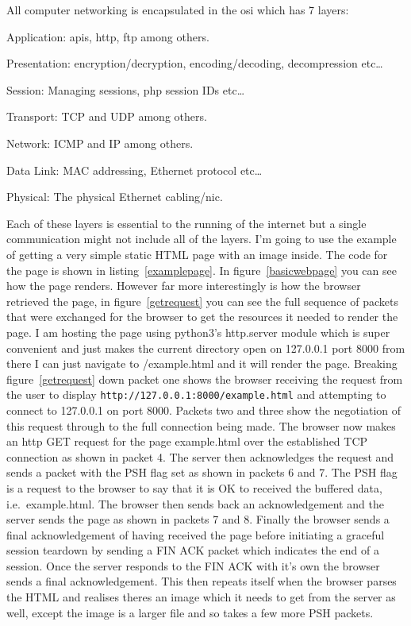 \documentclass[titlepage]{article}
\begin{document}
All computer networking is encapsulated in the \gls{osi} which has 7 layers:
\begin{etaremune}
  \item{Application: \gls{api}s, \gls{http}, \gls{ftp} among others.}
  \item{Presentation: encryption/decryption, encoding/decoding, decompression etc\ldots}
  \item{Session: Managing sessions, \gls{php} session IDs etc\ldots}
  \item{Transport: TCP and UDP among others.}
  \item{Network: ICMP and IP among others.}
  \item{Data Link: MAC addressing, Ethernet protocol etc\ldots}
  \item{Physical: The physical Ethernet cabling/\gls{nic}.}
\end{etaremune}
Each of these layers is essential to the running of the internet but a single communication
might not include all of the layers. I'm going to use the example of getting a very
simple static HTML page with an image inside. The code for the page is shown in
listing~\ref{examplepage}. In figure~\ref{basicwebpage} you can see how the page renders.
However far more interestingly is how the browser retrieved the page, in figure~\ref{getrequest}
you can see the full sequence of packets that were exchanged for the browser to get the resources
it needed to render the page. I am hosting the page using python3's http.server module
which is super convenient and just makes the current directory open on 127.0.0.1 port 8000
from there I can just navigate to /example.html and it will render the page. Breaking
figure~\ref{getrequest} down packet one shows the browser receiving the request from
the user to display \verb|http://127.0.0.1:8000/example.html| and attempting to connect
to 127.0.0.1 on port 8000. Packets two and three show the negotiation of this request
through to the full connection being made. The browser now makes an \gls{http} GET
request for the page example.html over the established TCP connection as shown in packet 4.
The server then acknowledges the request and sends a packet with the PSH flag set
as shown in packets 6 and 7. The PSH flag is a request to the browser to say that it is
OK to received the buffered data, i.e.\ example.html. The browser then sends back an
acknowledgement and the server sends the page as shown in packets 7 and 8. Finally
the browser sends a final acknowledgement of having received the page before initiating
a graceful session teardown by sending a FIN ACK packet which indicates the end of a session.
Once the server responds to the FIN ACK with it's own the browser sends a final acknowledgement.
This then repeats itself when the browser parses the HTML and realises theres an image which
it needs to get from the server as well, except the image is a larger file and so takes a few
more PSH packets.
\end{document}

